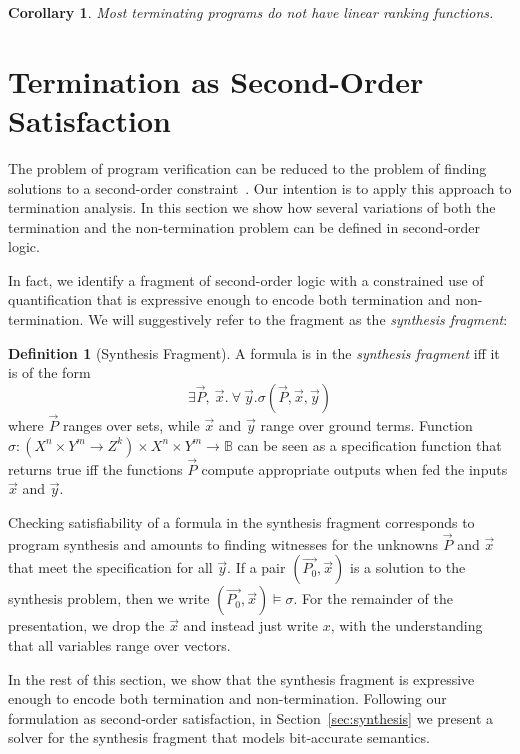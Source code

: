 \documentclass[preprint]{sigplanconf}
\newtheorem{corollary}[theorem]{Corollary}
\theoremstyle{definition}
\newtheorem{definition}[theorem]{Definition}
\begin{document}
\begin{corollary}
 Most terminating programs do not have linear ranking functions.
\end{corollary}
\fi


\section{Termination as Second-Order Satisfaction} \label{sec:second.order}


The problem of program verification can be reduced to the problem of finding
solutions to a second-order
constraint~\cite{DBLP:conf/pldi/GrebenshchikovLPR12,DBLP:conf/pldi/GulwaniSV08}. 
Our intention is to apply this approach to termination analysis.  In this
section we show how several variations of both the termination and the
non-termination problem can be defined in second-order logic.


In fact, we identify a fragment of second-order logic with a constrained use
of quantification that is expressive enough to encode both termination and
non-termination.  We will suggestively refer to the fragment as the
\emph{synthesis fragment}:


\begin{definition}[Synthesis Fragment]
A formula is in the \emph{synthesis fragment} iff it is of the form
%
 \[
  \exists \vec{P},~ \vec{x} . ~\forall~ \vec{y} . \sigma(\vec{P}, \vec{x}, \vec{y})
 \]
%
where $\vec{P}$ ranges over sets, while $\vec{x}$ and $\vec{y}$ range over
ground terms.  Function $\sigma: (X^n \times Y^m \to Z^k) \times X^n \times
Y^m \to \mathbb{B}$ can be seen as a specification function that returns
true iff the functions $\vec{P}$ compute appropriate outputs when fed the
inputs $\vec{x}$ and $\vec{y}$.
%
\end{definition}
%
Checking satisfiability of a formula in the synthesis fragment corresponds to program synthesis and
amounts to finding witnesses for the unknowns $\vec{P}$ and $\vec{x}$ that meet the specification
for all $\vec{y}$. 
If a pair $(\vec{P_0}, \vec{x})$ is a solution to the synthesis problem, then we write $(\vec{P_0}, \vec{x}) \models \sigma$.
For the remainder of the presentation, we drop the $\vec{x}$ and instead just write $x$, with the understanding
that all variables range over vectors.

In the rest of this section, we show that the synthesis fragment 
is expressive enough to encode both termination and non-termination. 
Following our formulation as second-order satisfaction, 
in Section~\ref{sec:synthesis} we present a solver for the synthesis fragment that models bit-accurate semantics. 
\end{document}
